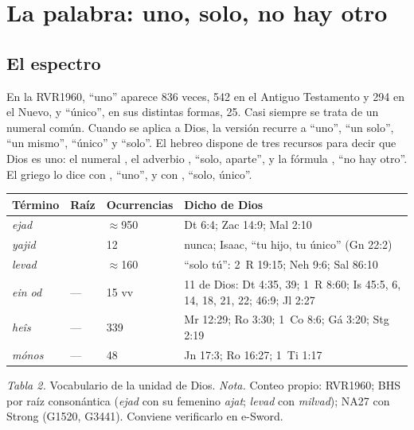 
\section{La palabra: uno, solo, no hay otro}

\subsection{El espectro}
En la RVR1960, ``uno'' aparece 836 veces, 542 en el Antiguo Testamento y 294 en el Nuevo, y ``único'', en sus distintas formas, 25. Casi siempre se trata de un numeral común. Cuando se aplica a Dios, la versión recurre a ``uno'', ``un solo'', ``un mismo'', ``único'' y ``solo''. El hebreo dispone de tres recursos para decir que Dios es uno: el numeral , el adverbio , ``solo, aparte'', y la fórmula , ``no hay otro''. El griego lo dice con , ``uno'', y con , ``solo, único''.

\begin{center}\small\renewcommand{\arraystretch}{1.25}
\begin{tabular}{@{}L{2.8cm}L{1.4cm}L{2.2cm}L{8.0cm}@{}}
\toprule
\textbf{Término} & \textbf{Raíz} & \textbf{Ocurrencias} & \textbf{Dicho de Dios} \\ \midrule
{} \emph{ejad} &  & $\approx$950 & Dt 6:4; Zac 14:9; Mal 2:10 \\
 \emph{yajid} &  & 12 & nunca; Isaac, ``tu hijo, tu único'' (Gn 22:2) \\
 \emph{levad} &  & $\approx$160 & ``solo tú'': 2~R 19:15; Neh 9:6; Sal 86:10 \\
 \emph{ein od} & --- & 15 vv & 11 de Dios: Dt 4:35, 39; 1~R 8:60; Is 45:5, 6, 14, 18, 21, 22; 46:9; Jl 2:27 \\
 \emph{heîs} & --- & 339 & Mr 12:29; Ro 3:30; 1~Co 8:6; Gá 3:20; Stg 2:19 \\
 \emph{mónos} & --- & 48 & Jn 17:3; Ro 16:27; 1~Ti 1:17 \\
\bottomrule
\end{tabular}\par
{\footnotesize\color{gris}\textit{Tabla 2.} Vocabulario de la unidad de Dios. \textit{Nota.} Conteo propio: RVR1960; BHS por raíz consonántica (\emph{ejad} con su femenino \emph{ajat}; \emph{levad} con \emph{milvad}); NA27 con Strong (G1520, G3441). Conviene verificarlo en e-Sword.}
\end{center}

